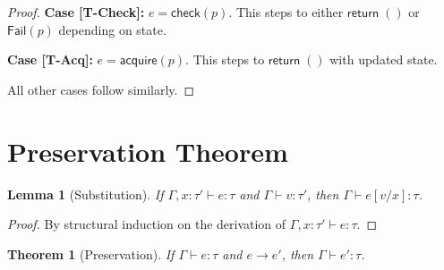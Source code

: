\documentclass[11pt,twoside,openright]{book}
\theoremstyle{definition}
\theoremstyle{plain}
\newtheorem{theorem}[definition]{Theorem}
\newtheorem{lemma}[definition]{Lemma}
\theoremstyle{remark}
\newcommand{\rpmret}{\mathsf{return}}
\newcommand{\smallstep}{\to}
\newcommand{\Failed}{\mathsf{Fail}}
\begin{document}
\begin{proof}
\textbf{Case [T-Check]:} $e = \mathsf{check}(p)$.
This steps to either $\rpmret\; ()$ or $\Failed(p)$ depending on state.

\textbf{Case [T-Acq]:} $e = \mathsf{acquire}(p)$.
This steps to $\rpmret\; ()$ with updated state.

All other cases follow similarly.
\end{proof}

\section{Preservation Theorem}

\begin{lemma}[Substitution]
\label{lem:substitution}
If $\Gamma, x : \tau' \vdash e : \tau$ and $\Gamma \vdash v : \tau'$, then $\Gamma \vdash e[v/x] : \tau$.
\end{lemma}

\begin{proof}
By structural induction on the derivation of $\Gamma, x : \tau' \vdash e : \tau$.
\end{proof}

\begin{theorem}[Preservation]
\label{thm:preservation}
If $\Gamma \vdash e : \tau$ and $e \smallstep e'$, then $\Gamma \vdash e' : \tau$.
\end{theorem}
\end{document}
